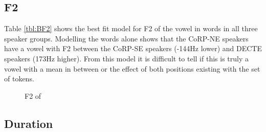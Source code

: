 \documentclass[../../../00.FullDoc/tex/ThesisSkeleton-draft2]{subfiles}
\begin{document}





\subsection{F2}
Table \ref{tbl:BF2} shows the best fit model for F2 of the vowel in \bath{} words in all three speaker groups. Modelling the \bath{} words alone shows that the CoRP-NE speakers have a vowel with F2 between the CoRP-SE speakers (-144Hz lower) and DECTE speakers (173Hz higher). From this model it is difficult to tell if this is truly a vowel with a mean in between or the effect of both positions existing with the set of tokens. 



\begin{figure}[h]
	
	\caption{F2 of \bath{}} \label{fig:BF2NE}
\end{figure}




\subsection{Duration}



	
	
	
	
	
	
	\pagebreak
	
	
	
\end{document}
